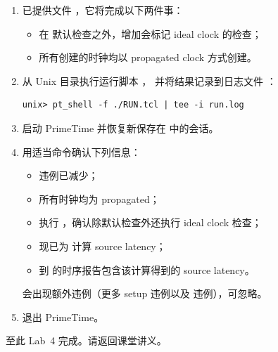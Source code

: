\begin{enumerate}
  \item 已提供文件 ，它将完成以下两件事：
\begin{itemize}
  \item 在  默认检查之外，增加会标记 ideal clock 的检查；
  \item 所有创建的时钟均以 propagated clock 方式创建。
\end{itemize}

  \item 从  Unix 目录执行运行脚本 ，
        并将结果记录到日志文件 ：
\begin{lstlisting}
unix> pt_shell -f ./RUN.tcl | tee -i run.log
\end{lstlisting}

  \item 启动 PrimeTime 并恢复新保存在  中的会话。

  \item 用适当命令确认下列信息：
\begin{itemize}
  \item {} 违例已减少；
  \item 所有时钟均为 propagated；
  \item 执行 ，确认除默认检查外还执行 ideal clock 检查；
  \item 现已为  计算 source latency；
  \item 到  的时序报告包含该计算得到的 source latency。
\end{itemize}

\begin{noteBox}
会出现额外违例（更多 setup 违例以及  违例），可忽略。
\end{noteBox}

  \item 退出 PrimeTime。
\end{enumerate}

\noindent 至此 Lab~4 完成。请返回课堂讲义。
